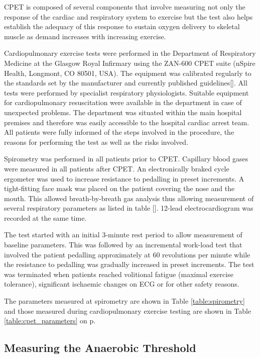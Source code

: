 CPET is composed of several components that involve measuring not only the response of the cardiac and respiratory system to exercise but the test also helps establish the adequacy of this response to sustain oxygen delivery to skeletal muscle as demand increases with increasing exercise. 

Cardiopulmonary exercise tests were performed in the Department of Respiratory Medicine at the Glasgow Royal Infirmary using the ZAN-600 CPET suite (nSpire Health, Longmont, CO 80501, USA). The equipment was calibrated regularly to the standards set by the manufacturer and currently published guidelines[]. All tests were performed by specialist respiratory physiologists. Suitable equipment for cardiopulmonary resuscitation were available in the department in case of unexpected problems. The department was situated within the main hospital premises and therefore was easily accessible to the hospital cardiac arrest team. All patients were fully informed of the steps involved in the procedure, the reasons for performing the test as well as the risks involved. 

Spirometry was performed in all patients prior to CPET. Capillary blood gases were measured in all patients after CPET. An electronically braked cycle ergometer was used to increase resistance to pedalling in preset increments. A tight-fitting face mask was placed on the patient covering the nose and the mouth. This allowed breath-by-breath gas analysis thus allowing measurement of several respiratory parameters as listed in table []. 12-lead electrocardiogram was recorded at the same time. 

The test started with an initial 3-minute rest period to allow measurement of baseline parameters. This was followed by an incremental work-load test that involved the patient pedalling approximately at 60 revolutions per minute while the resistance to pedalling was gradually increased in preset increments. The test was terminated when patients reached volitional fatigue (maximal exercise tolerance), significant ischaemic changes on ECG or for other safety reasons. 

The parameters measured at spirometry are shown in Table \ref{table:spirometry} and those measured during cardiopulmonary exercise testing are shown in Table \ref{table:cpet_parameters} on p\pageref{table:cpet_parameters}.

\subsection{Measuring the Anaerobic Threshold}

